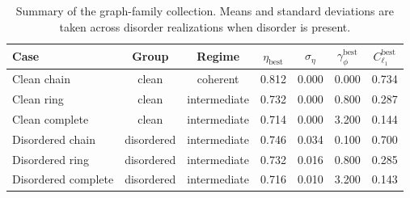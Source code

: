 \begin{table}[t]
\centering
\caption{Summary of the graph-family collection. Means and standard deviations are taken across disorder realizations when disorder is present.}
\begin{tabular}{lcccccc}
\toprule
Case & Group & Regime & $\eta_{\mathrm{best}}$ & $\sigma_{\eta}$ & $\gamma_{\phi}^{\mathrm{best}}$ & $C_{\ell_1}^{\mathrm{best}}$ \\
\midrule
Clean chain & clean & coherent & 0.812 & 0.000 & 0.000 & 0.734 \\
Clean ring & clean & intermediate & 0.732 & 0.000 & 0.800 & 0.287 \\
Clean complete & clean & intermediate & 0.714 & 0.000 & 3.200 & 0.144 \\
Disordered chain & disordered & intermediate & 0.746 & 0.034 & 0.100 & 0.700 \\
Disordered ring & disordered & intermediate & 0.732 & 0.016 & 0.800 & 0.285 \\
Disordered complete & disordered & intermediate & 0.716 & 0.010 & 3.200 & 0.143 \\
\bottomrule
\end{tabular}
\end{table}
